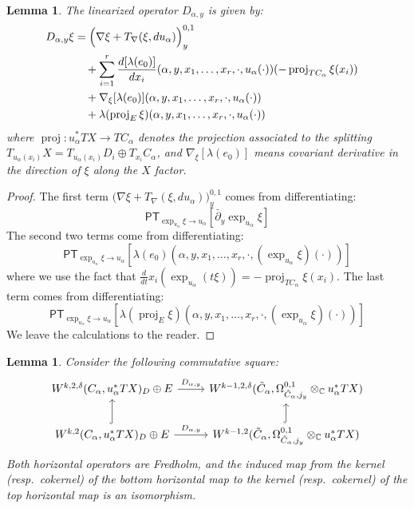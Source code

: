 \documentclass[12pt]{article}
\newtheorem{lemma}[theorem]{Lemma}
\theoremstyle{definition}
\theoremstyle{remark}
\numberwithin{equation}{subsection}
\newcommand{\CC}{\mathbb C}
\newcommand{\PT}{\mathsf{PT}}
\newcommand{\proj}{\operatorname{proj}}
\newcommand{\delbar}{\bar\partial}
\begin{document}
\begin{lemma}\label{linearizedformula}
The linearized operator $D_{\alpha,y}$ is given by:
\begin{align}\label{formulaforlinearizedoperator}
D_{\alpha,y}\xi&=\Bigl(\nabla\xi+T_\nabla(\xi,du_\alpha)\Bigr)^{0,1}_y\cr
&\quad+\sum_{i=1}^r\frac{d[\lambda(e_0)]}{dx_i}(\alpha,y,x_1,\ldots,x_r,\cdot,u_\alpha(\cdot))(-\proj_{TC_\alpha}\xi(x_i))\cr
&\quad+\nabla_\xi[\lambda(e_0)](\alpha,y,x_1,\ldots,x_r,\cdot,u_\alpha(\cdot))\cr
&\quad+\lambda(\proj_E\xi)(\alpha,y,x_1,\ldots,x_r,\cdot,u_\alpha(\cdot))
\end{align}
where $\proj:u_\alpha^\ast TX\to TC_\alpha$ denotes the projection associated to the splitting $T_{u_\alpha(x_i)}X=T_{u_\alpha(x_i)}D_i\oplus T_{x_i}C_\alpha$, and $\nabla_\xi[\lambda(e_0)]$ means covariant derivative in the direction of $\xi$ along the $X$ factor.
\end{lemma}

\begin{proof}
The first term $\bigl(\nabla\xi+T_\nabla(\xi,du_\alpha)\bigr)^{0,1}_y$ comes from differentiating:
\begin{equation}
\PT_{\exp_{u_\alpha}\xi\to u_\alpha}\left[\delbar_y\exp_{u_\alpha}\xi\right]
\end{equation}
The second two terms come from differentiating:
\begin{equation}
\PT_{\exp_{u_\alpha}\xi\to u_\alpha}\left[\lambda(e_0)(\alpha,y,x_1,\ldots,x_r,\cdot,(\exp_{u_\alpha}\xi)(\cdot))\right]
\end{equation}
where we use the fact that $\frac d{dt}x_i(\exp_{u_\alpha}(t\xi))=-\proj_{TC_\alpha}\xi(x_i)$.  The last term comes from differentiating:
\begin{equation}
\PT_{\exp_{u_\alpha}\xi\to u_\alpha}\left[\lambda(\proj_E\xi)(\alpha,y,x_1,\ldots,x_r,\cdot,(\exp_{u_\alpha}\xi)(\cdot))\right]
\end{equation}
We leave the calculations to the reader.
\end{proof}

\begin{lemma}\label{fredholmandsamekernelcokernel}
Consider the following commutative square:
\begin{equation}\label{fredholmsquare}
\begin{tikzcd}
W^{k,2,\delta}(C_\alpha,u_\alpha^\ast TX)_D\oplus E\ar{r}{D_{\alpha,y}}&W^{k-1,2,\delta}(\tilde C_\alpha,\Omega^{0,1}_{\tilde C_\alpha,j_y}\otimes_\CC u_\alpha^\ast TX)\\
W^{k,2}(C_\alpha,u_\alpha^\ast TX)_D\oplus E\ar[hook]{u}\ar{r}{D_{\alpha,y}}&W^{k-1,2}(\tilde C_\alpha,\Omega^{0,1}_{\tilde C_\alpha,j_y}\otimes_\CC u_\alpha^\ast TX)\ar[hook]{u}
\end{tikzcd}
\end{equation}
Both horizontal operators are Fredholm, and the induced map from the kernel (resp.\ cokernel) of the bottom horizontal map to the kernel (resp.\ cokernel) of the top horizontal map is an isomorphism.
\end{lemma}
\end{document}

